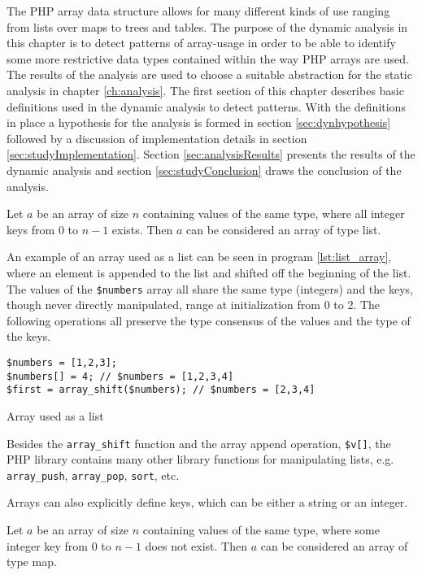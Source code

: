 The PHP array data structure allows for many different kinds of use ranging from lists over maps to trees and tables. The purpose of the dynamic analysis in this chapter is to detect patterns of array-usage in order to be able to identify some more restrictive data types contained within the way PHP arrays are used. The results of the analysis are used to choose a suitable abstraction for the static analysis in chapter \ref{ch:analysis}. The first section of this chapter describes basic definitions used in the dynamic analysis to detect patterns. With the definitions in place a hypothesis for the analysis is formed in section \ref{sec:dynhypothesis} followed by a discussion of implementation details in section \ref{sec:studyImplementation}. Section \ref{sec:analysisResults} presents the results of the dynamic analysis and section \ref{sec:studyConclusion} draws the conclusion of the analysis.

\begin{definition}
\label{def:list}
Let $a$ be an array of size $n$ containing values of the same type, where all integer keys from 0 to $n-1$ exists. Then $a$ can be considered an array of type list.
\end{definition}

An example of an array used as a list can be seen in program \ref{lst:list_array}, where an element is appended to the list and shifted off the beginning of the list. The values of the \texttt{\$numbers} array all share the same type (integers) and the keys, though never directly manipulated, range at initialization from 0 to 2. The following operations all preserve the type consensus of the values and the type of the keys. 

\begin{program}[ht]
\begin{lstlisting}
$numbers = [1,2,3];
$numbers[] = 4; // $numbers = [1,2,3,4]
$first = array_shift($numbers); // $numbers = [2,3,4]
\end{lstlisting}
\caption{Array used as a list}
\label{lst:list_array}
\end{program}

Besides the \texttt{array\_shift} function and the array append operation, \texttt{\$v[]}, the PHP library contains many other library functions for manipulating lists, e.g. \texttt{array\_push}, \texttt{array\_pop}, \texttt{sort}, etc.

Arrays can also explicitly define keys, which can be either a string or an integer. 

\begin{definition}
\label{def:map}
Let $a$ be an array of size $n$ containing values of the same type, where some integer key from 0 to $n-1$ does not exist. Then $a$ can be considered an array of type map.
\end{definition}

